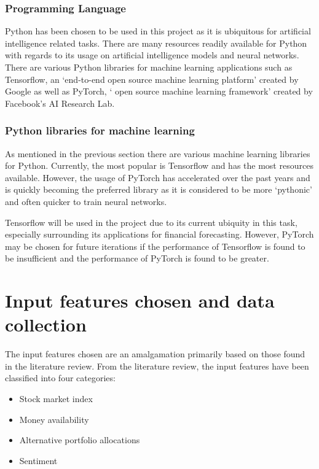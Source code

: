 \subsubsection{Programming Language}
Python has been chosen to be used in this project as it is ubiquitous for artificial intelligence related
tasks. There are many resources readily available for Python with regards to its usage on artificial
intelligence models and neural networks. There are various Python libraries for machine learning applications
such as Tensorflow, an `end-to-end open source machine learning platform' created by Google as well as
PyTorch, ` open source machine learning framework' created by Facebook's AI Research Lab.

\subsubsection{Python libraries for machine learning}
As mentioned in the previous section there are various machine learning libraries for Python. Currently, the
most popular is Tensorflow and has the most resources available.
However, the usage of PyTorch has accelerated over the past years and is quickly becoming the preferred
library as it is considered to be more `pythonic' and often quicker to train neural networks.

Tensorflow will be used in the project due to its current ubiquity in this task, especially surrounding
its applications for financial forecasting. However, PyTorch may be chosen for future iterations if
the performance of Tensorflow is found to be insufficient and the performance of PyTorch is found to be
greater.

\section{Input features chosen and data collection}
The input features chosen are an amalgamation primarily based on those found in the literature review.
From the literature review, the input features have been classified into four categories:
\begin{itemize}
    \item Stock market index
    \item Money availability
    \item Alternative portfolio allocations
    \item Sentiment
\end{itemize}

